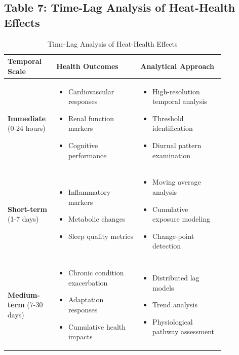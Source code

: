 \graphicspath{{./}{./sections/images/}{./images/}}\documentclass[12pt,a4paper,landscape]{article}
\begin{document}
\subsection*{Table 7: Time-Lag Analysis of Heat-Health Effects}
\begin{table}[H]
\centering
\caption{Time-Lag Analysis of Heat-Health Effects}
\label{tab:time_lag}
\begin{tabular}{L{0.15\linewidth}L{0.35\linewidth}L{0.35\linewidth}}
\toprule
\textbf{Temporal Scale} & \textbf{Health Outcomes} & \textbf{Analytical Approach} \\
\midrule
\textbf{Immediate} \newline(0-24 hours) & 
\begin{itemize}[leftmargin=*]
    \item Cardiovascular responses
    \item Renal function markers
    \item Cognitive performance
\end{itemize} & 
\begin{itemize}[leftmargin=*]
    \item High-resolution temporal analysis
    \item Threshold identification
    \item Diurnal pattern examination
\end{itemize} \\
\midrule
\textbf{Short-term} \newline(1-7 days) & 
\begin{itemize}[leftmargin=*]
    \item Inflammatory markers
    \item Metabolic changes
    \item Sleep quality metrics
\end{itemize} & 
\begin{itemize}[leftmargin=*]
    \item Moving average analysis
    \item Cumulative exposure modeling
    \item Change-point detection
\end{itemize} \\
\midrule
\textbf{Medium-term} \newline(7-30 days) & 
\begin{itemize}[leftmargin=*]
    \item Chronic condition exacerbation
    \item Adaptation responses
    \item Cumulative health impacts
\end{itemize} & 
\begin{itemize}[leftmargin=*]
    \item Distributed lag models
    \item Trend analysis
    \item Physiological pathway assessment
\end{itemize} \\
\bottomrule
\end{tabular}
\end{table}
\end{document}
